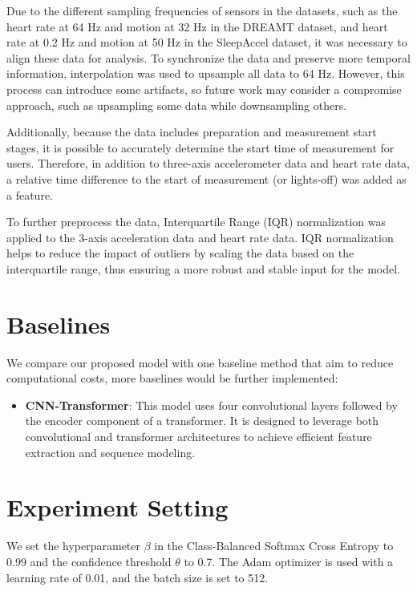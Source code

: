 \hspace{2em}Due to the different sampling frequencies of sensors in the datasets, such as the heart rate at 64 Hz and motion at 32 Hz in the DREAMT dataset, and heart rate at 0.2 Hz and motion at 50 Hz in the SleepAccel dataset, it was necessary to align these data for analysis. To synchronize the data and preserve more temporal information, interpolation was used to upsample all data to 64 Hz. However, this process can introduce some artifacts, so future work may consider a compromise approach, such as upsampling some data while downsampling others.

Additionally, because the data includes preparation and measurement start stages, it is possible to accurately determine the start time of measurement for users. Therefore, in addition to three-axis accelerometer data and heart rate data, a relative time difference to the start of measurement (or lights-off) was added as a feature.

To further preprocess the data, Interquartile Range (IQR) normalization was applied to the 3-axis acceleration data and heart rate data. IQR normalization helps to reduce the impact of outliers by scaling the data based on the interquartile range, thus ensuring a more robust and stable input for the model.

\section{Baselines}

\hspace{2em}We compare our proposed model with one baseline method that aim to reduce computational costs, more baselines would be further implemented:

\begin{itemize}
    \item \textbf{CNN-Transformer}: This model uses four convolutional layers followed by the encoder component of a transformer. It is designed to leverage both convolutional and transformer architectures to achieve efficient feature extraction and sequence modeling.
\end{itemize}


\section{Experiment Setting}

\hspace{2em}We set the hyperparameter \(\beta\) in the Class-Balanced Softmax Cross Entropy to 0.99 and the confidence threshold \(\theta\) to 0.7. The Adam optimizer is used with a learning rate of 0.01, and the batch size is set to 512.

